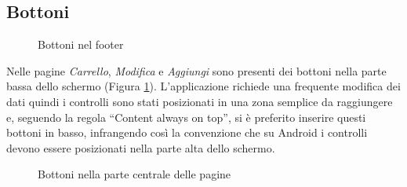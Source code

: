 \documentclass[12pt, a4paper, titlepage]{report}
\begin{document}
	\subsection{Bottoni}
	
	\begin{figure}[H] 
		\centering
		\hspace*{2cm}
		\caption{Bottoni nel footer}
		\label{fig:buttons}
	\end{figure}
	Nelle pagine \textit{Carrello}, \textit{Modifica} e \textit{Aggiungi} sono presenti dei bottoni nella parte bassa dello schermo (Figura \ref{fig:buttons}). L'applicazione richiede una frequente modifica dei dati quindi i controlli sono stati posizionati in una zona semplice da raggiungere e, seguendo la regola ``Content always on top'', si è preferito inserire questi bottoni in basso, infrangendo così la convenzione che su Android i controlli devono essere posizionati nella parte alta dello schermo. 
	\begin{figure}[H] 
		\centering
		\hspace*{1cm}
		\hspace*{1cm}
		\caption{Bottoni nella parte centrale delle pagine}
		\label{fig:item-buttons}
	\end{figure}
\end{document}
